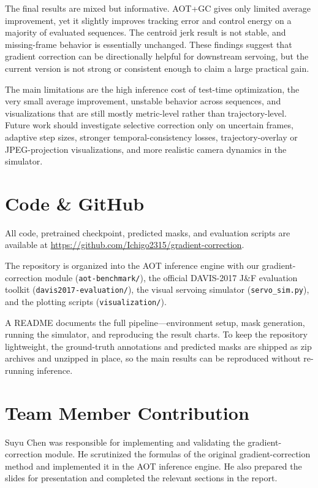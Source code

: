 \documentclass{article}
\begin{document}
The final results are mixed but informative. AOT+GC gives only limited average improvement, yet it
slightly improves tracking error and control energy on a majority of evaluated sequences. The centroid
jerk result is not stable, and missing-frame behavior is essentially unchanged. These findings suggest
that gradient correction can be directionally helpful for downstream servoing, but the current version is
not strong or consistent enough to claim a large practical gain.

The main limitations are the high inference cost of test-time optimization, the very small average
improvement, unstable behavior across sequences, and visualizations that are still mostly metric-level
rather than trajectory-level. Future work should investigate selective correction only on uncertain
frames, adaptive step sizes, stronger temporal-consistency losses, trajectory-overlay or JPEG-projection
visualizations, and more realistic camera dynamics in the simulator.

\section{Code \& GitHub}

All code, pretrained checkpoint, predicted masks, and evaluation scripts are available at
\url{https://github.com/Ichigo2315/gradient-correction}.

The repository is organized into the AOT inference engine with our gradient-correction module
(\texttt{aot-benchmark/}), the official DAVIS-2017 J\&F evaluation toolkit (\texttt{davis2017-evaluation/}), the visual servoing simulator (\texttt{servo\_sim.py}), and the
plotting scripts (\texttt{visualization/}).

A README documents the full pipeline---environment setup, mask generation, running the simulator, and reproducing the
result charts. To keep the repository lightweight, the ground-truth annotations and predicted masks are shipped as zip archives and unzipped in place, so the main results can be reproduced without re-running inference.

\section{Team Member Contribution}

Suyu Chen was responsible for implementing and validating the gradient-correction module. He scrutinized the formulas of the original gradient-correction method and implemented it in the AOT inference engine. He also prepared the slides for presentation and completed the relevant sections in the report.
\end{document}
